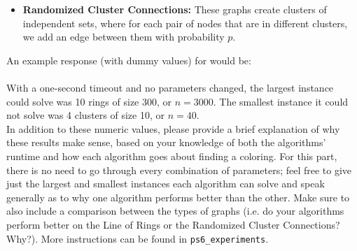 \documentclass[11pt]{article}
\begin{document}
\begin{enumerate}
\begin{enumerate}
\begin{itemize}
        \item \textbf{Randomized Cluster Connections:} These graphs create clusters of independent sets, where for each pair of nodes
        that are in different clusters, we add an edge between them with probability $p$. 
    \end{itemize} 
    An example response (with dummy values) for \MaximalISColoring would be:  \\ \\  With a one-second timeout and no parameters changed, the largest instance \MaximalISColoring could solve was 10 rings of size 300, or $n = 3000$. The smallest instance it could not solve was 4 clusters of size 10, or $n = 40$. \\
    
    
    In addition to these numeric values, please provide a brief explanation of why these results make sense, based on your knowledge of both the algorithms' runtime and how each algorithm goes about finding a coloring. For this part, there is no need to go through every combination of parameters; feel free to give just the largest and smallest instances each algorithm can solve and speak generally as to why one algorithm performs better than the other. Make sure to also include a comparison between the types of graphs (i.e. do your algorithms perform better on the Line of Rings or the Randomized Cluster Connections? Why?). More instructions can be found in \texttt{ps6\_experiments}.


    

 
    
  \end{enumerate}
    
\end{enumerate}
\end{document}
